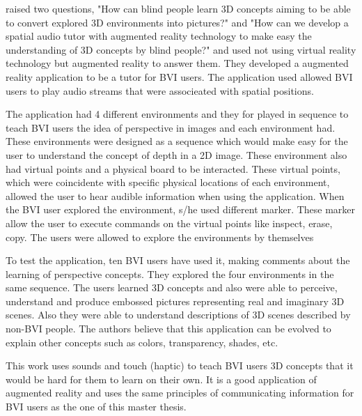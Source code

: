  raised two questions, "How can blind people learn 3D concepts aiming to be able to convert explored 3D environments into pictures?" and "How can we develop a spatial audio tutor with augmented reality technology to make easy the understanding of 3D concepts by blind people?" and used not using virtual reality technology but augmented reality to answer them. They developed a augmented reality application to be a tutor for BVI users. The application used allowed BVI users to play audio streams that were associeated with spatial positions.

The application had 4 different environments and they for played in sequence to teach BVI users the idea of perspective in images and each environment had. These environments were designed as a sequence which would make easy for the user to understand the concept of depth in a 2D image. These environment also had virtual points and a physical board to be interacted. These virtual points, which were coincidente with specific physical locations of each environment, allowed the user to hear audible information when using the application. When the BVI user explored the environment, s/he used different marker. These marker allow the user to execute commands on the virtual points like inspect, erase, copy. The users were allowed to explore the environments by themselves

To test the application, ten BVI users have used it, making comments about the learning of perspective concepts. They explored the four environments in the same sequence. The users learned 3D concepts and also were able to  perceive, understand and produce embossed pictures representing real and imaginary 3D scenes. Also they were able to understand descriptions of 3D scenes described by non-BVI people. The authors believe that this application can be evolved to explain other concepts such as colors, transparency, shades, etc. 

This work uses sounds and touch (haptic) to teach BVI users 3D concepts that it would be hard for them to learn on their own. It is a good application of augmented reality and uses the same principles of communicating information for BVI users as the one of this master thesis.